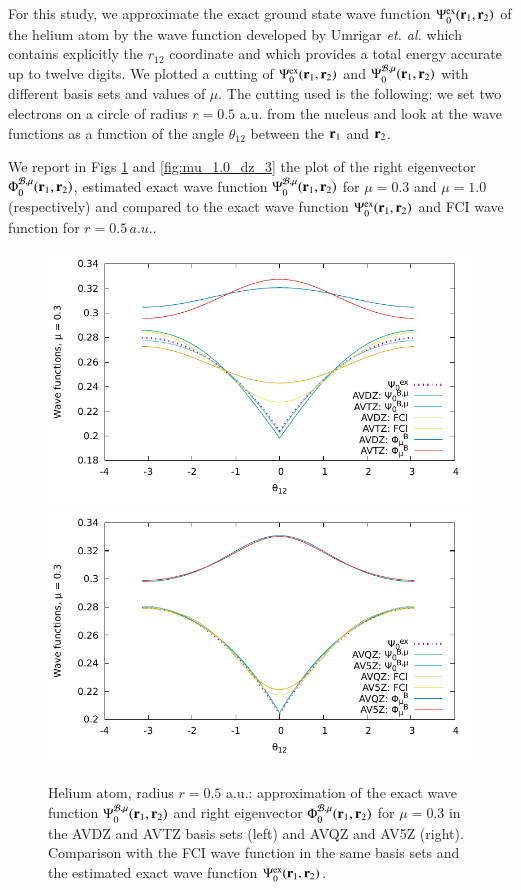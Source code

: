 \documentclass[aip,jcp,reprint,noshowkeys,superscriptaddress]{revtex4-1}
\newcommand{\br}[0]{{\bf {r}}}
\newcommand{\bri}[1]{{\bf r}_{#1}}
\newcommand{\psiex}[0]{\Psi^{\text{ex}}_0}
\newcommand{\phimub}[0]{\Phi^{\mathcal{B},\mu}_0}
\newcommand{\psimub}[0]{\Psi^{\mathcal{B},\mu}_0}
\begin{document}
For this study, we approximate the exact ground state wave function $\psiex(\br{}_1,\br{}_2)$ of the helium atom by the wave function developed by Umrigar \textit{et. al.}\cite{UmrGon-PRA-94} which contains explicitly the $r_{12}$ coordinate and which provides a total energy accurate up to twelve digits.  
We plotted a cutting of $\psiex(\br{}_1,\br{}_2)$ and  $\psimub(\br{}_1,\br{}_2) $ with different basis sets and values of $\mu$. The cutting used is the following: we set two electrons on a circle of radius $r=0.5$ a.u. from the nucleus and look at the wave functions as a function of the angle $\theta_{12}$ between the $\bri{1}$ and $\bri{2}$. 

We report in Figs \ref{fig:mu_0.3_dz_3} and \ref{fig:mu_1.0_dz_3} the plot of the right eigenvector $\phimub(\br{}_1,\br{}_2)$, estimated exact wave function $\psimub(\br{}_1,\br{}_2)$ for $\mu=0.3$ and $\mu=1.0$ (respectively) and compared to the exact wave function $\psiex(\br{}_1,\br{}_2)$ and FCI wave function for $r=0.5\,a.u.$. 
\begin{figure}
 \label{fig:mu_0.3_dz_3}
        \includegraphics[width=0.45\linewidth]{plots/He//He_mu_0_3_cusp_avdz_avtz_3.pdf}
        \includegraphics[width=0.45\linewidth]{plots/He/He_mu_0_3_cusp_avqz_av5z_3.pdf}\\
        \caption{
        Helium atom, radius $r=0.5$ a.u.: approximation of the exact wave function $\psimub(\br{}_1,\br{}_2)$ and right eigenvector $\phimub(\br{}_1,\br{}_2)$ for $\mu=0.3$ in the AVDZ and AVTZ basis sets (left) and AVQZ and AV5Z (right). Comparison with the FCI wave function in the same basis sets and the estimated exact wave function $\psiex(\br{}_1,\br{}_2)$.  }
\end{figure}
\end{document}
